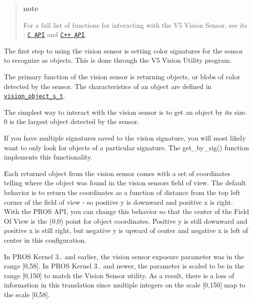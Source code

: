 \begin{quote}
{\bfseries note}

For a full list of functions for interacting with the V5 Vision Sensor, see its \+: \href{../../api/c/vision.html}{\tt C A\+PI} and \href{../../api/cpp/vision.html}{\tt C++ A\+PI}.

\end{quote}


The first step to using the vision sensor is setting color signatures for the sensor to recognize as objects. This is done through the V5 Vision Utility program.

The primary function of the vision sensor is returning objects, or blobs of color detected by the sensor. The characteristics of an object are defined in \href{../../api/c/vision.html#vision_object_s_t}{\tt vision\+\_\+object\+\_\+s\+\_\+t}.

The simplest way to interact with the vision sensor is to get an object by its size. 0 is the largest object detected by the sensor.

If you have multiple signatures saved to the vision signature, you will most likely want to only look for objects of a particular signature. The {\ttfamily get\+\_\+by\+\_\+sig()} function implements this functionality.

Each returned object from the vision sensor comes with a set of coordinates telling where the object was found in the vision sensor\textquotesingle{}s field of view. The default behavior is to return the coordinates as a function of distance from the top left corner of the field of view -\/ so positive y is downward and positive x is right. With the P\+R\+OS A\+PI, you can change this behavior so that the center of the Field Of View is the (0,0) point for object coordinates. Positive y is still downward and positive x is still right, but negative y is upward of center and negative x is left of center in this configuration.

In P\+R\+OS Kernel 3.. and earlier, the vision sensor exposure parameter was in the range \mbox{[}0,58\mbox{]}. In P\+R\+OS Kernel 3.. and newer, the parameter is scaled to be in the range \mbox{[}0,150\mbox{]} to match the Vision Sensor utility. As a result, there is a loss of information in this translation since multiple integers on the scale \mbox{[}0,150\mbox{]} map to the scale \mbox{[}0,58\mbox{]}. 